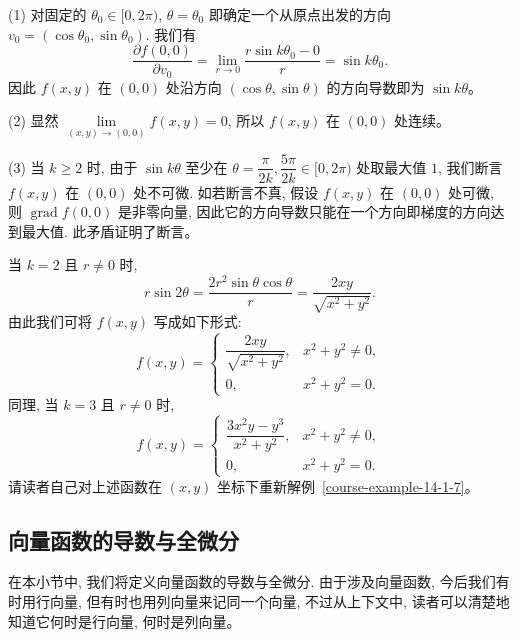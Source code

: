 \documentclass[UTF8,12pt,a4paper,fontset=fandol]{ctexart}
\begin{document}
\begin{solve}\quad (1) 对固定的 $\theta_0\in[0,2\pi)$, $\theta=\theta_0$ 即确定一个从原点出发的方向 $v_0=(\cos\theta_0,\sin\theta_0)$. 我们有
\[
  \frac{\partial f(0,0)}{\partial v_0}
  =\lim_{r\to0}\frac{r\sin k\theta_0-0}{r}
  =\sin k\theta_0.
\]
因此 $f(x,y)$ 在 $(0,0)$ 处沿方向 $(\cos\theta,\sin\theta)$ 的方向导数即为 $\sin k\theta$。

(2) 显然 $\lim\limits_{(x,y)\to(0,0)}f(x,y)=0$, 所以 $f(x,y)$ 在 $(0,0)$ 处连续。

(3) 当 $k\geqslant2$ 时, 由于 $\sin k\theta$ 至少在 $\theta=\dfrac{\pi}{2k}, \dfrac{5\pi}{2k}\in[0,2\pi)$ 处取最大值 $1$, 我们断言 $f(x,y)$ 在 $(0,0)$ 处不可微. 如若断言不真, 假设 $f(x,y)$ 在 $(0,0)$ 处可微, 则 $\operatorname{grad}f(0,0)$ 是非零向量, 因此它的方向导数只能在一个方向即梯度的方向达到最大值. 此矛盾证明了断言。

\end{solve}
\begin{remark}\quad 当 $k=2$ 且 $r\ne0$ 时,
\[
  r\sin2\theta=\frac{2r^2\sin\theta\cos\theta}{r}
  =\frac{2xy}{\sqrt{x^2+y^2}}.
\]
由此我们可将 $f(x,y)$ 写成如下形式:
\[
  f(x,y)=
  \begin{cases}
    \dfrac{2xy}{\sqrt{x^2+y^2}}, &x^2+y^2\ne0,\\
    0, &x^2+y^2=0.
  \end{cases}
\]
同理, 当 $k=3$ 且 $r\ne0$ 时,
\[
  f(x,y)=
  \begin{cases}
    \dfrac{3x^2y-y^3}{x^2+y^2}, &x^2+y^2\ne0,\\
    0, &x^2+y^2=0.
  \end{cases}
\]
请读者自己对上述函数在 $(x,y)$ 坐标下重新解例~\ref{course-example-14-1-7}。

\end{remark}
\subsection{向量函数的导数与全微分}

在本小节中, 我们将定义向量函数的导数与全微分. 由于涉及向量函数, 今后我们有时用行向量, 但有时也用列向量来记同一个向量, 不过从上下文中, 读者可以清楚地知道它何时是行向量, 何时是列向量。
\end{document}

